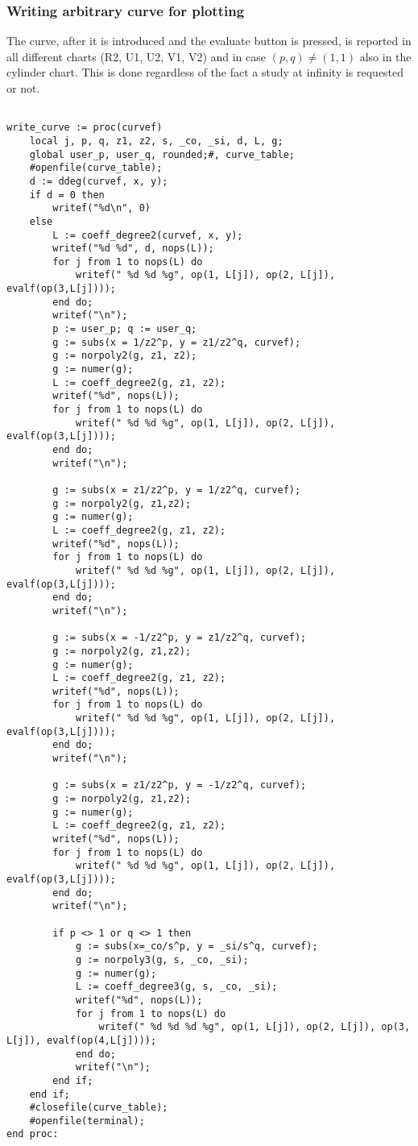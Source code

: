 \documentclass[a4paper,10pt]{article}
\begin{document}
\subsubsection{Writing arbitrary curve for plotting}

The curve, after it is introduced and the evaluate button is pressed, is reported in all different charts (R2, U1, U2, V1, V2) and in case $(p,q)\not=(1,1)$ also in the cylinder chart.  This is done regardless of the fact a study at infinity is requested or not.

\begin{lstlisting}[name=writelog2]

write_curve := proc(curvef)
    local j, p, q, z1, z2, s, _co, _si, d, L, g;
    global user_p, user_q, rounded;#, curve_table;
    #openfile(curve_table);        
    d := ddeg(curvef, x, y);
    if d = 0 then
        writef("%d\n", 0)
    else
        L := coeff_degree2(curvef, x, y);
        writef("%d %d", d, nops(L));
        for j from 1 to nops(L) do
            writef(" %d %d %g", op(1, L[j]), op(2, L[j]), evalf(op(3,L[j])));
        end do;
        writef("\n");
        p := user_p; q := user_q;
        g := subs(x = 1/z2^p, y = z1/z2^q, curvef);
        g := norpoly2(g, z1, z2);
        g := numer(g);
        L := coeff_degree2(g, z1, z2);
        writef("%d", nops(L));
        for j from 1 to nops(L) do
            writef(" %d %d %g", op(1, L[j]), op(2, L[j]), evalf(op(3,L[j])));
        end do;
        writef("\n");

        g := subs(x = z1/z2^p, y = 1/z2^q, curvef);
        g := norpoly2(g, z1,z2);
        g := numer(g);
        L := coeff_degree2(g, z1, z2);
        writef("%d", nops(L));
        for j from 1 to nops(L) do
            writef(" %d %d %g", op(1, L[j]), op(2, L[j]), evalf(op(3,L[j])));
        end do;
        writef("\n");

        g := subs(x = -1/z2^p, y = z1/z2^q, curvef);
        g := norpoly2(g, z1,z2);
        g := numer(g);
        L := coeff_degree2(g, z1, z2);
        writef("%d", nops(L));
        for j from 1 to nops(L) do
            writef(" %d %d %g", op(1, L[j]), op(2, L[j]), evalf(op(3,L[j])));
        end do;
        writef("\n");

        g := subs(x = z1/z2^p, y = -1/z2^q, curvef);
        g := norpoly2(g, z1,z2);
        g := numer(g);
        L := coeff_degree2(g, z1, z2);
        writef("%d", nops(L));
        for j from 1 to nops(L) do
            writef(" %d %d %g", op(1, L[j]), op(2, L[j]), evalf(op(3,L[j])));
        end do;
        writef("\n");

        if p <> 1 or q <> 1 then
            g := subs(x=_co/s^p, y = _si/s^q, curvef);
            g := norpoly3(g, s, _co, _si);
            g := numer(g);
            L := coeff_degree3(g, s, _co, _si);
            writef("%d", nops(L));
            for j from 1 to nops(L) do
                writef(" %d %d %d %g", op(1, L[j]), op(2, L[j]), op(3, L[j]), evalf(op(4,L[j])));
            end do;
            writef("\n");
        end if;
    end if;
    #closefile(curve_table);
    #openfile(terminal);
end proc:
\end{lstlisting}
\end{document}
